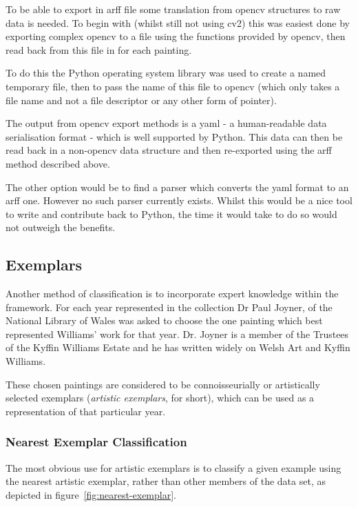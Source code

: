 To be able to export in \gls{arff} file some translation from \gls{opencv} structures to raw data is 
needed. To begin with (whilst still not using \gls{cv2}) this was easiest done by exporting 
complex \gls{opencv} to a file using the functions provided by \gls{opencv}, then read back from
this file in for each painting.

To do this the Python operating system library was used to create a named temporary file, then to
pass the name of this file to \gls{opencv} (which only takes a file name and not a file descriptor
or any other form of pointer). 

The output from \gls{opencv} export methods is a \gls{yaml} - a human-readable data serialisation
format - which is well supported by Python. This data can then be read back in a non-\gls{opencv}
data structure and then re-exported using the \gls{arff} method described above.

The other option would be to find a parser which converts the \gls{yaml} format to an \gls{arff} 
one. However no such parser currently exists. Whilst this would be a nice tool to write and
contribute back to Python, the time it would take to do so would not outweigh the benefits.


\subsection{Exemplars}
Another method of classification is to incorporate expert knowledge within the framework. For each
year represented in the collection Dr Paul Joyner, of the National Library of Wales was asked to
choose the one painting which best represented Williams' work for that year. Dr. Joyner is a 
member of the Trustees of the Kyffin Williams Estate and he has written widely on Welsh Art and
Kyffin Williams.

These chosen paintings are considered to be connoisseurially or artistically selected exemplars
(\emph{artistic exemplars}, for short), which can be used as a representation of that particular
year.


\subsubsection{Nearest Exemplar Classification}
The most obvious use for artistic exemplars is to classify a given example using the nearest 
artistic exemplar, rather than other members of the data set, as depicted in 
figure~\ref{fig:nearest-exemplar}.

